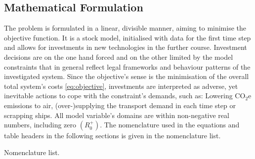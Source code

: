 \documentclass[article]{elsarticle}
\begin{document}
\subsection{Mathematical Formulation}
\label{subsec:Mat}
The problem is formulated in a linear, divisible manner, aiming to minimise the objective function. It is a stock model, initialised with data for the first time step and allows for investments in new technologies in the further course. Investment decisions are on the one hand forced and on the other limited by the model constraints that in general reflect legal frameworks and behaviour patterns of the investigated system. Since the objective's sense is the minimisation of the overall total system's costs \cref{eq:objective}, investments are interpreted as adverse, yet inevitable actions to cope with the constraint's demands, such as: Lowering CO$_2$e emissions to air, (over-)supplying the transport demand in each time step or scrapping ships. All model variable's domains are within non-negative real numbers, including zero $\left(R_{0}^{+}\right)$. The nomenclature used in the equations and table headers in the following sections is given in the nomenclature list.
\glsdisablehyper
\glsaddall
\begin{table}[thb]
\begin{mdframed}
\footnotesize{
\begin{multicols}{2}
\printglossary[style=tree,type=a]
\vspace{-0.3cm}
\printglossary[style=tree,type=s]
\vspace{-0.3cm}
\printglossary[style=tree,type=v]
\vspace{-0.3cm}
\printglossary[style=tree,type=p]
\end{multicols}
}
\end{mdframed}\label{box:nomenclature}
\caption*{Nomenclature list.}
\end{table}
\end{document}
